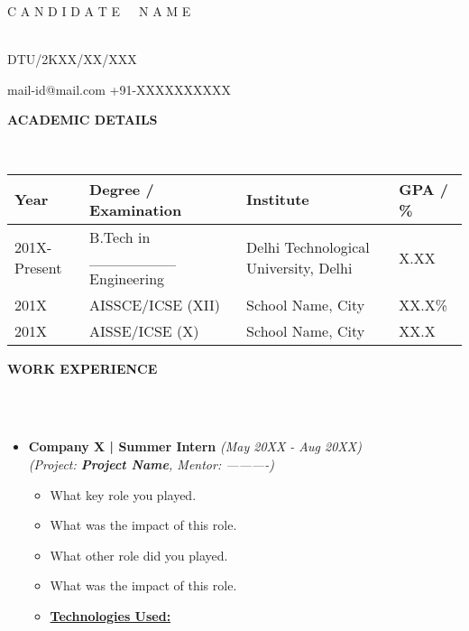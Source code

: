 \documentclass[a4paper,10pt]{article}
\newcommand{\isep}{-2 pt}
\newcommand{\lsep}{-0.5cm}
\newcommand{\resheading}[1]
{{
	\small \colorbox{mygrey}
	{\begin{minipage}
		{1.0\textwidth}
		{\textbf{#1 \vphantom{p\^{E}}}}
	\end{minipage}}
}}
\begin{document}
	\begin{center}
		\begin{Large}
			{C A N D I D A T E\ \ \ N A M E} 
		\end{Large} 
		\\
		DTU/2KXX/XX/XXX
	\end{center}
	\indent \hspace{10pt} mail-id@mail.com \hspace{300pt} +91-XXXXXXXXXX 
	\\[-0.3cm]

	\resheading{\textbf{ACADEMIC DETAILS} }
	\\[\lsep]

	\begin{center}
		\indent 
		\begin{tabular}
			{ l @{\hskip 0.15in} l @{\hskip 0.25in} l @{\hskip 0.25in}  l }
			\hline
			\textbf{Year} & \textbf{Degree / Examination} & \textbf{Institute} & \textbf{GPA / \%} \\
			\hline
			201X-Present & B.Tech in \_\_\_\_\_\_\_\_ Engineering & 
			Delhi Technological University, Delhi & X.XX\\
			201X & AISSCE/ICSE (XII) & 
			School Name, City & XX.X\% \\
			201X & AISSE/ICSE (X) & 
			School Name, City & XX.X\\
			\hline
		\end{tabular}
	\end{center}

	\resheading{\textbf{WORK EXPERIENCE} }\\[\lsep]
	\\[-0.25cm]
	\begin{itemize}
		\item \textbf{Company X |  Summer Intern} \hspace{235pt} \emph{(May 20XX - Aug 20XX)}
 		\\ [0.1cm]
 		\emph{(Project: \textbf{Project Name}, Mentor: ----------)} \\[-0.6cm]
    		\begin{itemize}\itemsep \isep
				\item What key role you played.
   				\item What was the impact of this role. 
    			\item What other role did you played.
    			\item What was the impact of this role.
    			\item \underline{\textbf{Technologies Used:}} 
    		\end{itemize}
	\end{itemize}
\end{document}
